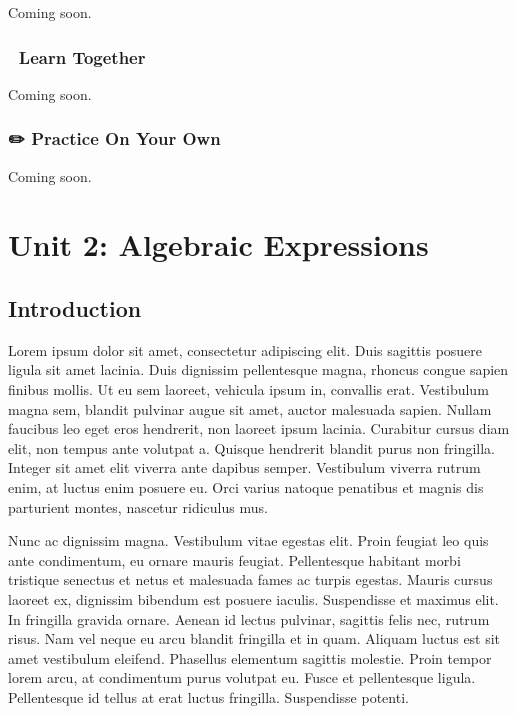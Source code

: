 \documentclass[
  letterpaper,
]{scrrept}
\begin{document}

Coming soon.

\section*{🧠 Learn Together}\label{learn-together-7}


Coming soon.

\section*{✏️ Practice On Your Own}\label{practice-on-your-own-7}


Coming soon.

\part{Unit 2: Algebraic Expressions}

\chapter*{Introduction}\label{introduction-1}


Lorem ipsum dolor sit amet, consectetur adipiscing elit. Duis sagittis
posuere ligula sit amet lacinia. Duis dignissim pellentesque magna,
rhoncus congue sapien finibus mollis. Ut eu sem laoreet, vehicula ipsum
in, convallis erat. Vestibulum magna sem, blandit pulvinar augue sit
amet, auctor malesuada sapien. Nullam faucibus leo eget eros hendrerit,
non laoreet ipsum lacinia. Curabitur cursus diam elit, non tempus ante
volutpat a. Quisque hendrerit blandit purus non fringilla. Integer sit
amet elit viverra ante dapibus semper. Vestibulum viverra rutrum enim,
at luctus enim posuere eu. Orci varius natoque penatibus et magnis dis
parturient montes, nascetur ridiculus mus.

Nunc ac dignissim magna. Vestibulum vitae egestas elit. Proin feugiat
leo quis ante condimentum, eu ornare mauris feugiat. Pellentesque
habitant morbi tristique senectus et netus et malesuada fames ac turpis
egestas. Mauris cursus laoreet ex, dignissim bibendum est posuere
iaculis. Suspendisse et maximus elit. In fringilla gravida ornare.
Aenean id lectus pulvinar, sagittis felis nec, rutrum risus. Nam vel
neque eu arcu blandit fringilla et in quam. Aliquam luctus est sit amet
vestibulum eleifend. Phasellus elementum sagittis molestie. Proin tempor
lorem arcu, at condimentum purus volutpat eu. Fusce et pellentesque
ligula. Pellentesque id tellus at erat luctus fringilla. Suspendisse
potenti.
\end{document}
